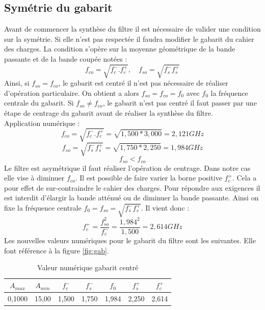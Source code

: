 \documentclass[french]{article}
\begin{document}
\subsection{Symétrie du gabarit}
Avant de commencer la synthèse du filtre il est nécessaire de valider une condition sur la symétrie. Si elle n'est pas respectée il faudra modifier le gabarit du cahier des charges. La condition s'opère sur la moyenne géométrique de la bande passante et de la bande coupée notées :
\begin{equation}
	 f_{co} = \sqrt{f_c^-.f_c^+}, \quad f_{so} = \sqrt{f_s^- f_s^+}
\end{equation}
Ainsi, si $f_{so} = f_{co}$, le gabarit est centré il n'est pas nécessaire de réaliser d'opération particulaire. On obtient a alors  $f_{so} = f_{co} = f_0$ avec $f_0$ la fréquence centrale du gabarit. Si $f_{so} \neq f_{co}$, le gabarit n'est pas centré il faut passer par une étape de centrage du gabarit avant de réaliser la synthèse du filtre.\\
Application numérique :\\
\begin{equation}
f_{co} = \sqrt{f_c^-.f_c^+} = \sqrt{1,500*3,000} = 2,121 GHz
\end{equation}
\begin{equation}
	f_{so} = \sqrt{f_s^- f_s^+} = \sqrt{1,750*2,250} = 1,984 GHz
\end{equation}
\begin{equation}
f_{so} <	f_{co}
\end{equation}
Le filtre est asymétrique il faut réaliser l'opération de centrage. Dans notre cas elle vise à diminuer $f_{co}$. Il est possible de faire varier la borne positive $f_c^+$. Cela a pour effet de sur-contraindre le cahier des charges. Pour répondre aux exigences il est interdit d'élargir la bande atténué ou de diminuer la bande passante. Ainsi on fixe la fréquence centrale $f_0 = f_{so} = \sqrt{f_s^- f_s^+}$.  
Il vient donc :
\begin{equation}
f_c^+=\frac{f_{so}^2}{f_c^-}=\frac{1,984^2}{1,500}=2,614GHz
\end{equation}
Les nouvelles valeurs numériques pour le gabarit du filtre sont les suivantes. Elle font référence à la figure \ref{fig:gab}.
	\begin{table}[H]
	\centering
	\begin{tabular}{|c|c|c|c|c|c|c|}
		\hline
		$A_{max}$& $A_{min}$ & $f_c^-$ & $f_s^-$ & $f_0$ & $f_s^+$ &$f_c^+$ \\ \hline
		0,1000		 & 15,00 		& 1,500	   & 1,750 & 1,984 & 2,250& 2,614 \\ \hline
	\end{tabular}
	\caption{Valeur numérique gabarit centré}
\end{table}
\end{document}
